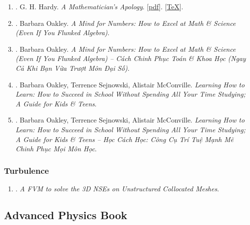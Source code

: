 \documentclass{article}
\begin{document}
\begin{enumerate}
	\item \cite{Hardy1940, Hardy1992, Hardy2022}. G. H. Hardy. \textit{A Mathematician's Apology}. [\href{https://github.com/NQBH/hobby/blob/master/advanced_mathematics/Hardy2017/NQBH_Hardy2017.pdf}{pdf}]. [\href{https://github.com/NQBH/hobby/blob/master/advanced_mathematics/Hardy2017/NQBH_Hardy2017.tex}{\TeX}].\hfill{}
	\item \cite{Oakley2014}. Barbara Oakley. \textit{A Mind for Numbers: How to Excel at Math \& Science (Even If You Flunked Algebra)}.\\\mbox{}\hfill{}
	\item \cite{Oakley2022}. Barbara Oakley. \textit{A Mind for Numbers: How to Excel at Math \& Science (Even If You Flunked Algebra) -- Cách Chinh Phục Toán \& Khoa Học (Ngay Cả Khi Bạn Vừa Trượt Môn Đại Số)}.\hfill{}
	\item \cite{Oakley_Sejnowski_McConville2018}. Barbara Oakley, Terrence Sejnowski, Alistair McConville. \textit{Learning How to Learn: How to Succeed in School Without Spending All Your Time Studying; A Guide for Kids \& Teens}.\hfill{}
	\item \cite{Oakley_Sejnowski_McConville2022}. Barbara Oakley, Terrence Sejnowski, Alistair McConville. \textit{Learning How to Learn: How to Succeed in School Without Spending All Your Time Studying; A Guide for Kids \& Teens -- Học Cách Học: Công Cụ Trí Tuệ Mạnh Mẽ Chinh Phục Mọi Môn Học}.\hfill{}
\end{enumerate}

\subsubsection{Turbulence}

\begin{enumerate}
	\item \cite{Perron_Boivin_Herard2004}. \textit{A FVM to solve the 3{D} NSEs on Unstructured Collocated Meshes}.\hfill{}
\end{enumerate}


\subsection{Advanced Physics Book}
\end{document}
